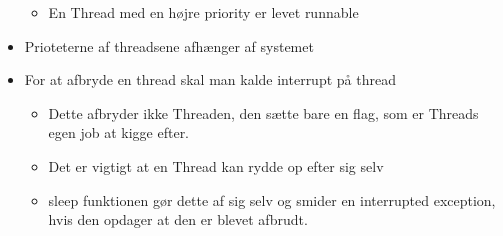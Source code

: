 \documentclass{article}
\begin{document}
\begin{itemize}
\begin{itemize}
		\item En Thread med en højre priority er levet runnable
	\end{itemize}
	\item Prioteterne af threadsene afhænger af systemet
	\item For at afbryde en thread skal man kalde interrupt på thread
	\begin{itemize}
		\item Dette afbryder ikke Threaden, den sætte bare en flag, som er Threads egen job at kigge efter.
		\item Det er vigtigt at en Thread kan rydde op efter sig selv
		\item sleep funktionen gør dette af sig selv og smider en interrupted exception, hvis den opdager at den er blevet afbrudt. 
	\end{itemize}
\end{itemize}
\end{document}
